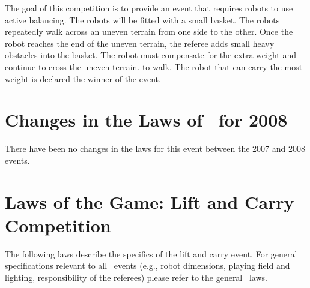\documentclass[12pt]{hurocup}
\begin{document}
The goal of this competition is to provide an event that requires
robots to use active balancing. The robots will be fitted with a small
basket. The robots repeatedly walk across an uneven terrain from one
side to the other. Once the robot reaches the end of the uneven
terrain, the referee adds small heavy obstacles into the basket. The
robot must compensate for the extra weight and continue to cross the
uneven terrain.  to walk. The robot that can carry the most weight is
declared the winner of the event.

\section{Changes in the Laws of \HuroCup\ for 2008}

There have been no changes in the laws for this event between the 2007
and 2008 events.

\section{Laws of the Game: Lift and Carry Competition}
\label{sec:rules-lift-carry}

The following laws describe the specifics of the lift and carry
event. For general specifications relevant to all \HuroCup\ events
(e.g., robot dimensions, playing field and lighting, responsibility of
the referees) please refer to the general \HuroCup\ laws.

\label{lc-field}
\end{document}
